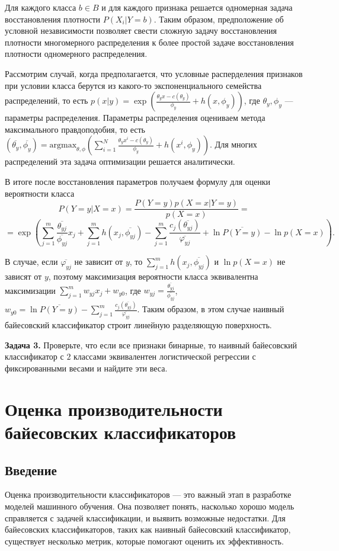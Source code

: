 Для каждого класса $b \in B$ и для каждого признака решается одномерная задача восстановления плотности $P(X_i|Y=b)$. Таким образом, предположение об условной независимости позволяет свести сложную задачу восстановления плотности многомерного распределения к более простой задаче восстановления плотности одномерного распределения.

Рассмотрим случай, когда предполагается, что условные расперделения признаков при условии класса берутся из какого-то экспоненциального семейства распределений, то есть $p(x|y) = \exp \left(\frac{\theta_y x-c(\theta_y)}{\phi_y} + h(x, \phi_y) \right)$, где $\theta_y, \phi_y$ --- параметры распределения. Параметры распределения оцениваем метода максимального правдоподобия, то есть $(\overline{\theta_y}, \overline{\phi_y}) = \text{argmax}_{\theta, \phi}\left(\sum_{i=1}^{N} \frac{\theta_yx^i-c(\theta_y)}{\phi_y} + h(x^i, \phi_y) \right)$.
Для многих распределений эта задача оптимизации решается аналитически.

В итоге после восстановления параметров получаем формулу для оценки вероятности класса
$$P(Y=y|X=x) = \frac{P(Y=y)p(X=x|Y=y)}{p(X=x)} = $$ $$ = \exp \left( \sum_{j=1}^{m} \frac{\overline{\theta_{yj}}}{\overline{\phi_{yj}}}x_j + \sum_{j=1}^{m}h(x_j, \overline{\phi_{yj}}) - \sum_{j=1}^{m}\frac{c_j(\overline{\theta_{yj}})}{\overline{\varphi_{yj}}} + \ln \overline{P(Y=y)} - \ln p(X=x) \right).$$

В случае, если $\overline{\varphi_{yj}}$ не зависит от $y$, то $\sum_{j=1}^{m}h(x_j, \overline{\phi_{yj}})$ и $\ln p(X=x)$ не зависят от $y$, поэтому максимизация вероятности класса эквивалентна максимизации $\sum_{j=1}^{m}w_{yj}x_j + w_{y0}$, где $w_{yj}=\frac{\overline{\theta_{yj}}}{\overline{\phi_{yj}}}$, $w_{y0}=\ln \overline{P(Y=y)} - \sum_{j=1}^{m}\frac{c_j(\overline{\theta_{yj}})}{\overline{\varphi_{yj}}}.$ Таким образом, в этом случае наивный байесовский классификатор строит линейную разделяющую поверхность.

\textbf{Задача 3.} Проверьте, что если все признаки бинарные, то наивный байесовский классификатор с $2$ классами эквивалентен логистической регрессии с фиксированными весами и найдите эти веса.

\section{Оценка производительности байесовских классификаторов}

\subsection{Введение}
Оценка производительности классификаторов — это важный этап в разработке моделей машинного обучения. Она позволяет понять, насколько хорошо модель справляется с задачей классификации, и выявить возможные недостатки. Для байесовских классификаторов, таких как наивный байесовский классификатор, существует несколько метрик, которые помогают оценить их эффективность.

